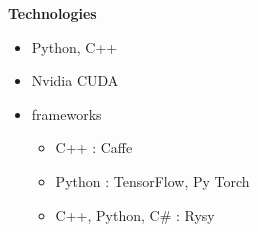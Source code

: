\documentclass[xcolor=dvipsnames]{beamer}
\begin{document}
\begin{frame}{\bf Technologies}

\begin{itemize}
  \item Python, C++
  \item Nvidia CUDA
  \item frameworks
      \begin{itemize}
        \item C++ : Caffe
        \item Python : TensorFlow, Py Torch
        \item C++, Python, C\# : Rysy
      \end{itemize}

\end{itemize}


\end{frame}
\end{document}
